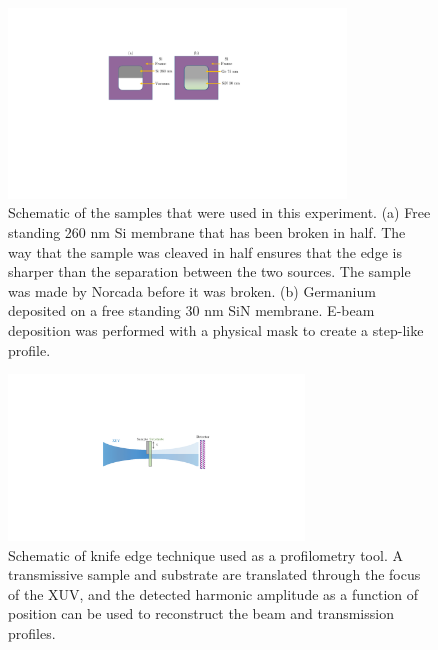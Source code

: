 \begin{figure}
	\centering
	\includegraphics[width=0.8\textwidth]{figures/refractive_index/samples.pdf}
	\caption[Schematic of the samples used to measure the refractive index of silicon and germanium]{Schematic of the samples that were used in this experiment.  (a) Free standing 260 nm Si membrane that has been broken in half.  The way that the sample was cleaved in half ensures that the edge is sharper than the separation between the two sources.  The sample was made by Norcada before it was broken. (b) Germanium deposited on a free standing 30 nm SiN membrane.  E-beam deposition was performed with a physical mask to create a step-like profile.}
	\label{fig:split_sample}
\end{figure}


\begin{figure}
	\centering
	\includegraphics[width=0.7\textwidth]{figures/refractive_index/knife_edge.pdf}
	\caption[Schematic of knife edge technique used as a profilometry tool]{Schematic of knife edge technique used as a profilometry tool.  A transmissive sample and substrate are translated through the focus of the XUV, and the detected harmonic amplitude as a function of position can be used to reconstruct the beam and transmission profiles.}
	\label{fig:knife_edge_schematic}
\end{figure}


